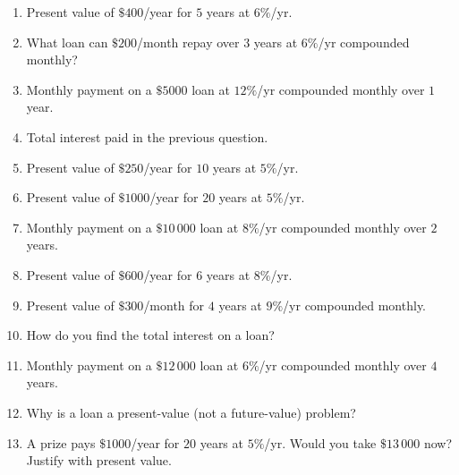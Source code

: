\documentclass[11pt]{article}
\begin{document}
\begin{recapbox}
\begin{multicols}{2}
\small
\begin{enumerate}[leftmargin=*,itemsep=3pt]
  \item Present value of $\$400$/year for $5$ years at $6\%$/yr.
  \item What loan can $\$200$/month repay over $3$ years at $6\%$/yr compounded monthly?
  \item Monthly payment on a $\$5000$ loan at $12\%$/yr compounded monthly over $1$ year.
  \item Total interest paid in the previous question.
  \item Present value of $\$250$/year for $10$ years at $5\%$/yr.
  \item Present value of $\$1000$/year for $20$ years at $5\%$/yr.
  \item Monthly payment on a $\$10\,000$ loan at $8\%$/yr compounded monthly over $2$ years.
  \item Present value of $\$600$/year for $6$ years at $8\%$/yr.
  \item Present value of $\$300$/month for $4$ years at $9\%$/yr compounded monthly.
  \item How do you find the total interest on a loan?
  \item Monthly payment on a $\$12\,000$ loan at $6\%$/yr compounded monthly over $4$ years.
  \item Why is a loan a present-value (not a future-value) problem?
  \item A prize pays $\$1000$/year for $20$ years at $5\%$/yr. Would you take $\$13\,000$ now? Justify with present value.
\end{enumerate}
\end{multicols}
\end{recapbox}
\end{document}
